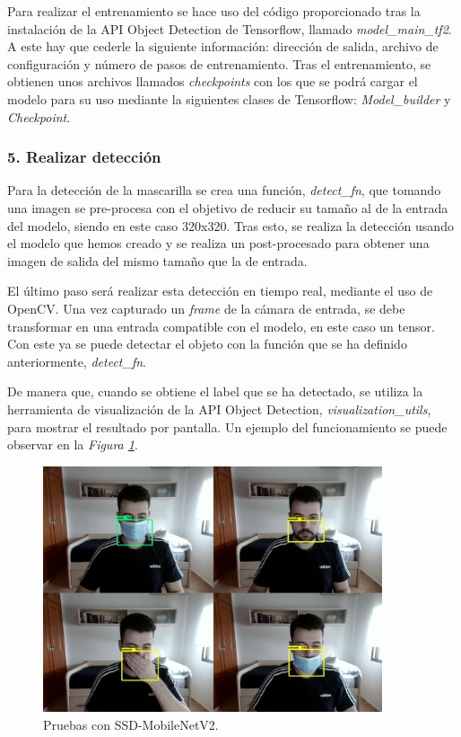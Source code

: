 Para realizar el entrenamiento se hace uso del código proporcionado tras la instalación de la API Object Detection de Tensorflow, llamado \textit{model\_main\_tf2}. A este hay que cederle la siguiente información: dirección de salida, archivo de configuración y número de pasos de entrenamiento. Tras el entrenamiento, se obtienen unos archivos llamados \textit{checkpoints} con los que se podrá cargar el modelo para su uso mediante la siguientes clases de Tensorflow: \textit{Model\_builder} y \textit{Checkpoint}.

\vspace{-0.5cm}
\subsubsection*{5. Realizar detección}
\vspace{-0.7cm}
Para la detección de la mascarilla se crea una función, \textit{detect\_fn}, que tomando una imagen se pre-procesa con el objetivo de  reducir su tamaño al de la entrada del modelo, siendo en este caso 320x320. Tras esto, se realiza la detección usando el modelo que hemos creado y se realiza un post-procesado para obtener una imagen de salida del mismo tamaño que la de entrada.

El último paso será realizar esta detección en tiempo real, mediante el uso de OpenCV. Una vez capturado un \textit{frame} de la cámara de entrada, se debe transformar en una entrada compatible con el modelo, en este caso un tensor. Con este ya se puede detectar el objeto con la función que se ha definido anteriormente, \textit{detect\_fn}. 

De manera que, cuando se obtiene el label que se ha detectado, se utiliza la herramienta de visualización de la API Object Detection, \textit{visualization\_utils}, para mostrar el resultado por pantalla. Un ejemplo del funcionamiento se puede observar en la \textit{Figura \ref{fig:protoTensorFlow}}.

\begin{figure}[htp]
	\centering
	\includegraphics[width=10cm]{imagenes/tf_prueba.png}
	\caption{Pruebas con SSD-MobileNetV2.}
	\label{fig:protoTensorFlow}
\end{figure}


